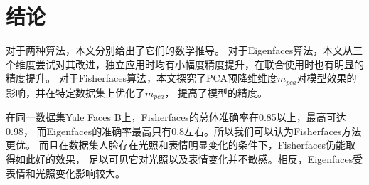 \documentclass{ctexart}
\begin{document}
\section{结论}
对于两种算法，本文分别给出了它们的数学推导。
对于Eigenfaces算法，本文从三个维度尝试对其改进，独立应用时均有小幅度精度提升，在联合使用时也有明显的精度提升。
对于Fisherfaces算法，本文探究了PCA预降维维度$m_{pca}$对模型效果的影响，并在特定数据集上优化了$m_{pca}$，
提高了模型的精度。

在同一数据集Yale Faces B上，Fisherfaces的总体准确率在0.85以上，最高可达0.98，
而Eigenfaces的准确率最高只有0.8左右。所以我们可以认为Fisherfaces方法更优。
而且在数据集人脸存在光照和表情明显变化的条件下，Fisherfaces仍能取得如此好的效果，
足以可见它对光照以及表情变化并不敏感。相反，Eigenfaces受表情和光照变化影响较大。




\newpage
{}



\newpage
\appendix
\end{document}
